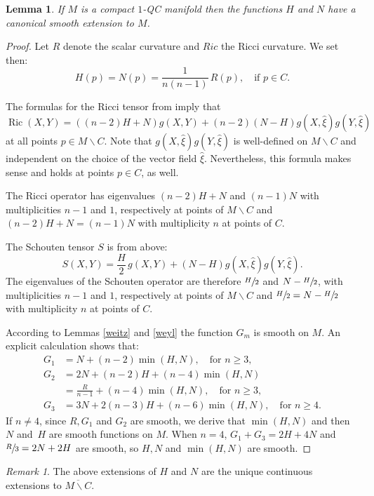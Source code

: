 \documentclass[10pt]{amsart}
\let\moins\smallsetminus
\DeclareMathOperator{\Ric}{Ric}
\newtheorem{lemma}[theorem]{Lemma}
\theoremstyle{definition}
\theoremstyle{remark}
\newtheorem{remark}[theorem]{Remark}
\numberwithin{equation}{section}
\begin{document}
\begin{lemma}\label{continuous}
If $M$ is a compact $1$-QC manifold
then the functions $H$ and $N$ have a canonical smooth
extension to $M$.
\end{lemma}
\begin{proof}
Let $R$ denote the scalar curvature and $Ric$ the Ricci curvature.
We set then:
\[H(p)=N(p)=\frac{1}{n(n-1)}\,R(p), \quad\text{if } p\in C.\]

The formulas for the Ricci tensor from \cite{BF,BP} imply that
\[ \Ric(X,Y)=((n-2)H+N)g(X,Y)+(n-2)(N-H)g(X,\widehat{\xi})g(Y,\widehat{\xi})\]
at all points $p\in M\moins C$. Note that
$g(X,\widehat{\xi})g(Y,\widehat{\xi})$ is well-defined on $M\moins C$
and independent on the choice of the vector field $\widehat{\xi}$.
Nevertheless, this formula makes sense
and holds at points $p\in C$, as well.

The Ricci operator has eigenvalues
$(n-2)H+N$ and $(n-1)N$ with multiplicities $n-1$ and $1$, respectively at points of $M\moins C$ and
$(n-2)H+N=(n-1)N$ with multiplicity $n$ at points of $C$.

The Schouten tensor $S$ is from above:
\[ S(X,Y)=\frac{H}{2}\,g(X,Y)+(N-H)g(X,\widehat{\xi})g(Y,\widehat{\xi}).\]
The eigenvalues of the Schouten operator are therefore
$\sfrac{H}{2}$ and $N-\sfrac{H}{2}$, with multiplicities $n-1$ and $1$, respectively at points of $M\moins C$ and
$\sfrac{H}{2}=N-\sfrac{H}{2}$ with multiplicity $n$ at points of $C$.

According to Lemmas \ref{weitz} and \ref{weyl} the function $G_m$ is smooth on $M$.
An explicit calculation shows that:
\begin{align*}
G_1&= N+(n-2)\min(H,N), \quad\text{for } n\geq3,\\[3pt]
G_2&=2N+ (n-2)H+(n-4)\min(H,N)\\[-5pt]
&=\frac{R}{n-1}+(n-4)\min(H,N), \quad\text{for } n\geq3,\\[3pt]
G_3&=3N+ 2(n-3)H+(n-6)\min(H,N), \quad\text{for } n\geq4.
\end{align*}
If $n\neq4$, since $R, G_1$ and $G_2$ are smooth, we derive that
$\min(H,N)$ and then $N$ and~$H$ are smooth functions on $M$.
When $n=4$, $G_1+G_3=2H+4N$ and $\sfrac{R}{3}=2N+2H$ are smooth, so
$H,N$ and $\min(H,N)$ are smooth.
\end{proof}
\begin{remark}
The above extensions of $H$ and $N$ are the unique continuous extensions to $\overline{M\moins C}$.
\end{remark}
\end{document}

